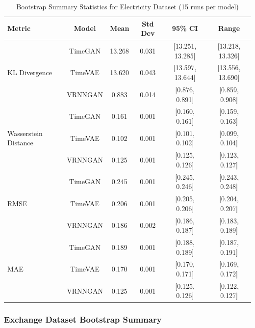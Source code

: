 \documentclass{article}
\begin{document}
\begin{table}[H]
\centering
\caption{Bootstrap Summary Statistics for Electricity Dataset (15 runs per model)}
\label{tab:bootstrap_electricity}
\small
\begin{tabular}{lccccc}
\toprule
\textbf{Metric} & \textbf{Model} & \textbf{Mean} & \textbf{Std Dev} & \textbf{95\% CI} & \textbf{Range} \\
\midrule
\multirow{3}{*}{KL Divergence} 
    & TimeGAN   & 13.268 & 0.031 & [13.251, 13.285] & [13.218, 13.326] \\
    & TimeVAE   & 13.620 & 0.043 & [13.597, 13.644] & [13.556, 13.690] \\
    & VRNNGAN   & 0.883  & 0.014 & [0.876, 0.891]   & [0.859, 0.908] \\
\midrule
\multirow{3}{*}{Wasserstein Distance} 
    & TimeGAN   & 0.161 & 0.001 & [0.160, 0.161] & [0.159, 0.163] \\
    & TimeVAE   & 0.102 & 0.001 & [0.101, 0.102] & [0.099, 0.104] \\
    & VRNNGAN   & 0.125 & 0.001 & [0.125, 0.126] & [0.123, 0.127] \\
\midrule
\multirow{3}{*}{RMSE} 
    & TimeGAN   & 0.245 & 0.001 & [0.245, 0.246] & [0.243, 0.248] \\
    & TimeVAE   & 0.206 & 0.001 & [0.205, 0.206] & [0.204, 0.207] \\
    & VRNNGAN   & 0.186 & 0.002 & [0.186, 0.187] & [0.183, 0.189] \\
\midrule
\multirow{3}{*}{MAE} 
& TimeGAN   & 0.189 & 0.001 & [0.188, 0.189] & [0.187, 0.191] \\
& TimeVAE   & 0.170 & 0.001 & [0.170, 0.171] & [0.169, 0.172] \\
& VRNNGAN   & 0.125 & 0.001 & [0.125, 0.126] & [0.122, 0.127] \\
\bottomrule
\end{tabular}
\end{table}

\subsubsection{Exchange Dataset Bootstrap Summary}
\end{document}
